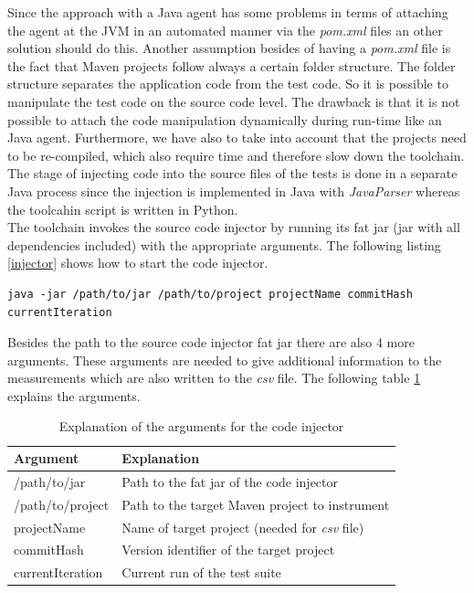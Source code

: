 \documentclass{seal_thesis}
\begin{document}
\noindent Since the approach with a Java agent has some problems in terms of attaching the agent at the JVM in an automated manner via the \textit{pom.xml} files an other solution should do this. Another assumption besides of having a \textit{pom.xml} file is the fact that Maven projects follow always a certain folder structure. The folder structure separates the application code from the test code. So it is possible to manipulate the test code on the source code level. The drawback is that it is not possible to attach the code manipulation dynamically during run-time like an Java agent. Furthermore, we have also to take into account that the projects need to be re-compiled, which also require time and therefore slow down the toolchain. The stage of injecting code into the source files of the tests is done in a separate Java process since the injection is implemented in Java with \textit{JavaParser} \cite{javaparser} whereas the toolcahin script is written in Python. \\

\noindent The toolchain invokes the source code injector by running its fat jar (jar with all dependencies included) with the appropriate arguments. The following listing \ref{injector} shows how to start the code injector.


\begin{lstlisting}[caption=Call source code injector,label=injector]
java -jar /path/to/jar /path/to/project projectName commitHash currentIteration
\end{lstlisting}

\noindent Besides the path to the source code injector fat jar there are also 4 more arguments. These arguments are needed to give additional information to the measurements which are also written to the \textit{csv} file. The following table \ref{tab:args} explains the arguments.



\begin{table}[ht]
\centering
\begin{tabular}{|l|l|}
\hline
\textbf{Argument} & \textbf{Explanation} \\ \hline
/path/to/jar & Path to the fat jar of the code injector \\ \hline
/path/to/project & Path to the target Maven project to instrument \\ \hline
  projectName & Name of target project (needed for \textit{csv} file) \\ \hline
commitHash & Version identifier of the target project \\ \hline
  currentIteration & Current run of the test suite \\ \hline
\end{tabular}
\caption{Explanation of the arguments for the code injector}
\label{tab:args}
\end{table}
\end{document}
